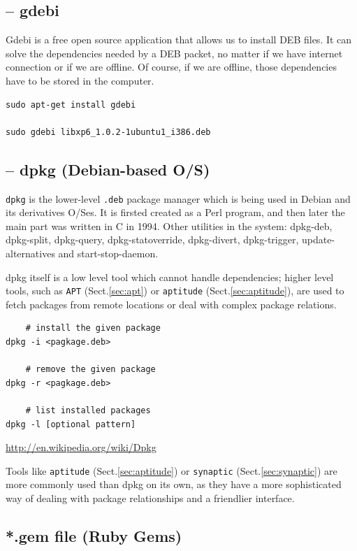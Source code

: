 \subsection{-- gdebi}
\label{sec:gdebi}

Gdebi is a free open source application that allows us to install DEB files. It
can solve the dependencies needed by a DEB packet, no matter if we have internet
connection or if we are offline. Of course, if we are offline, those
dependencies have to be stored in the computer.

\begin{verbatim}
sudo apt-get install gdebi

sudo gdebi libxp6_1.0.2-1ubuntu1_i386.deb
\end{verbatim}


\subsection{-- dpkg (Debian-based O/S)}
\label{sec:dpkg}

\verb!dpkg! is the lower-level \verb!.deb! package manager which is being used
in Debian and its derivatives O/Ses. It is firsted created as a Perl program,
and then later the main part was written in C in 1994. Other utilities in the
system: dpkg-deb, dpkg-split, dpkg-query, dpkg-statoverride, dpkg-divert,
dpkg-trigger, update-alternatives and start-stop-daemon.

dpkg itself is a low level tool which cannot handle dependencies; higher level
tools, such as \verb!APT! (Sect.\ref{sec:apt}) or \verb!aptitude!
(Sect.\ref{sec:aptitude}), are used to fetch packages from remote locations or
deal with complex package relations.
\begin{verbatim}
    # install the given package
dpkg -i <pagkage.deb>
    
    # remove the given package
dpkg -r <pagkage.deb>

    # list installed packages
dpkg -l [optional pattern] 
\end{verbatim}
\url{http://en.wikipedia.org/wiki/Dpkg}

Tools like \verb!aptitude! (Sect.\ref{sec:aptitude}) or \verb!synaptic!
(Sect.\ref{sec:synaptic}) are more commonly used than dpkg on its own, as they
have a more sophisticated way of dealing with package relationships and a friendlier interface.

\subsection{*.gem file (Ruby Gems)}
\label{sec:gem-Ruby}



